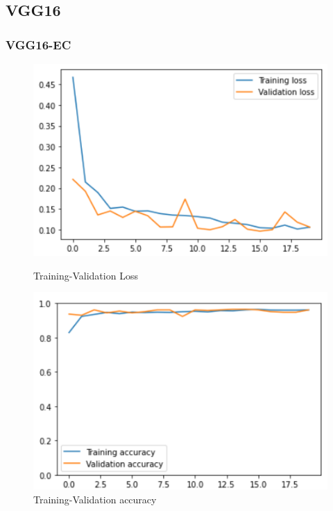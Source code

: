 \documentclass[11pt,a4paper]{article}
\theoremstyle{definition}
\begin{document}
\subsection{VGG16}

\subsubsection{VGG16-EC}

\begin{figure}[H]
  \centering
  \begin{minipage}[b]{0.45\textwidth}
    \includegraphics[scale=0.75]{./images/vggloss}
	\caption{Training-Validation Loss}
  \end{minipage}
  \hfill
  \begin{minipage}[b]{0.45\textwidth}
    \includegraphics[scale=0.75]{./images/vggacc}
	\caption{Training-Validation accuracy}
  \end{minipage}
\end{figure}
\end{document}

